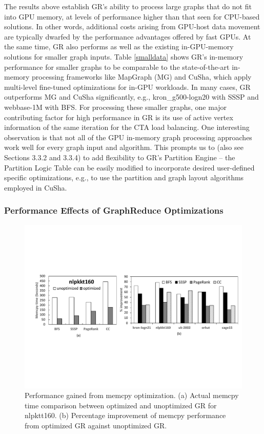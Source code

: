 The results above establish GR's ability to process large graphs that do not fit into GPU memory, at levels of performance higher than
that seen for CPU-based solutions. In other words, additional costs arising from GPU-host data movement are typically dwarfed by the
performance advantages offered by fast GPUs. At the same time, GR also performs as well as the existing in-GPU-memory solutions 
for smaller graph inputs. Table \ref{smalldata} shows GR's in-memory performance for smaller graphs to be comparable to the state-of-the-art 
in-memory processing frameworks like MapGraph (MG) and CuSha, which apply multi-level fine-tuned optimizations for in-GPU workloads. 
In many cases, GR outperforms MG and CuSha significantly, e.g., kron\_g500-logn20 with SSSP and webbase-1M with BFS. For processing 
these smaller graphs, one major contributing factor for high performance in GR is its use of active vertex information of the same iteration 
for the CTA load balancing. One interesting observation is that not all of the GPU in-memory graph processing approaches work well for every 
graph input and algorithm. This prompts us to (also see Sections 3.3.2 and 3.3.4) to add flexibility to GR's Partition Engine -- the Partition 
Logic Table can be easily modified to incorporate desired user-defined specific optimizations, e.g., to use the partition and graph layout algorithms
employed in CuSha.




\subsubsection{Performance Effects of GraphReduce Optimizations}


\begin{figure}[!t]
\centering
\includegraphics[width=\textwidth,height=\textheight,keepaspectratio]{figures/memcpy.pdf}
\caption{Performance gained from memcpy optimization. (a) Actual memcpy time comparison between optimized and unoptimized GR for nlpktt160. (b) Percentage improvement of memcpy performance from optimized GR against unoptimized GR. }
\label{fig:memcpy}
\end{figure}

